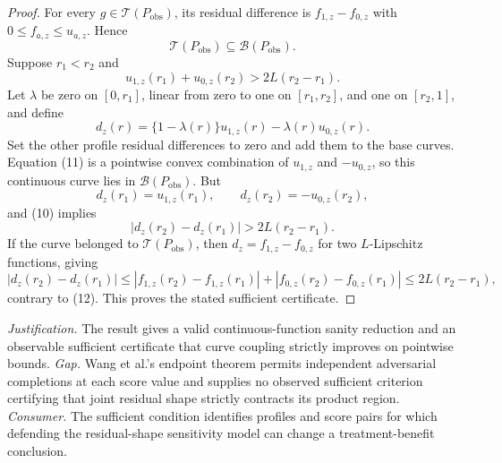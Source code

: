 \documentclass{article}
\begin{document}
\begin{proof}
For every \(g\in\mathcal T(P_{\mathrm{obs}})\), its residual difference is \(f_{1,z}-f_{0,z}\) with \(0\leq f_{a,z}\leq u_{a,z}\).  Hence
\[
\mathcal T(P_{\mathrm{obs}})\subseteq\mathcal B(P_{\mathrm{obs}}).
\tag{9}
\]
Suppose \(r_1<r_2\) and
\[
u_{1,z}(r_1)+u_{0,z}(r_2)>2L(r_2-r_1).
\tag{10}
\]
Let \(\lambda\) be zero on \([0,r_1]\), linear from zero to one on \([r_1,r_2]\), and one on \([r_2,1]\), and define
\[
d_z(r)=\{1-\lambda(r)\}u_{1,z}(r)-\lambda(r)u_{0,z}(r).
\tag{11}
\]
Set the other profile residual differences to zero and add them to the base curves.  Equation (11) is a pointwise convex combination of \(u_{1,z}\) and \(-u_{0,z}\), so this continuous curve lies in \(\mathcal B(P_{\mathrm{obs}})\).  But
\[
d_z(r_1)=u_{1,z}(r_1),\qquad
d_z(r_2)=-u_{0,z}(r_2),
\]
and (10) implies
\[
|d_z(r_2)-d_z(r_1)|>2L(r_2-r_1).
\tag{12}
\]
If the curve belonged to \(\mathcal T(P_{\mathrm{obs}})\), then \(d_z=f_{1,z}-f_{0,z}\) for two \(L\)-Lipschitz functions, giving
\[
|d_z(r_2)-d_z(r_1)|
\leq|f_{1,z}(r_2)-f_{1,z}(r_1)|
+|f_{0,z}(r_2)-f_{0,z}(r_1)|
\leq2L(r_2-r_1),
\]
contrary to (12).  This proves the stated sufficient certificate.
\end{proof}
\par\smallskip\noindent \textit{Justification.} The result gives a valid continuous-function sanity reduction and an observable sufficient certificate that curve coupling strictly improves on pointwise bounds. \textit{Gap.} Wang et al.'s endpoint theorem permits independent adversarial completions at each score value and supplies no observed sufficient criterion certifying that joint residual shape strictly contracts its product region. \textit{Consumer.} The sufficient condition identifies profiles and score pairs for which defending the residual-shape sensitivity model can change a treatment-benefit conclusion.
\end{document}
